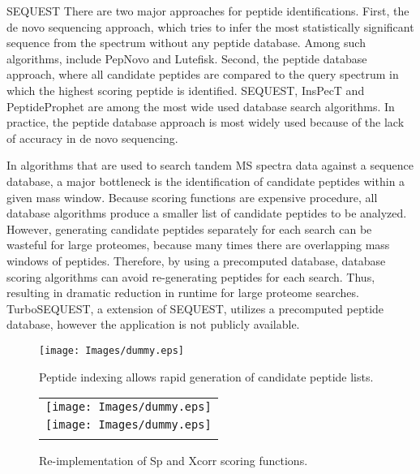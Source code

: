 \documentclass{bioinfo}
\begin{document}
SEQUEST\citep{eng:approach}
There are two major approaches for peptide identifications. First, the de novo sequencing approach, which tries to infer the most statistically significant sequence from the spectrum without any peptide database. Among such algorithms, include PepNovo and Lutefisk. Second, the peptide database approach, where all candidate peptides are compared to the query spectrum in which the highest scoring peptide is identified. SEQUEST, InsPecT and PeptideProphet are among the most wide used database search algorithms. In practice, the peptide database approach is most widely used because of the lack of accuracy in de novo sequencing.

In algorithms that are used to search tandem MS spectra data against a sequence database, a major bottleneck is the identification of candidate peptides within a given mass window. Because scoring functions are expensive procedure, all database algorithms produce a smaller list of candidate peptides to be analyzed. However, generating candidate peptides separately for each search can be wasteful for large proteomes, because many times there are overlapping mass windows of peptides. Therefore, by using a precomputed database, database scoring algorithms can avoid re-generating peptides for each search. Thus, resulting in dramatic reduction in runtime for large proteome searches. TurboSEQUEST, a extension of SEQUEST, utilizes a precomputed peptide database, however the application is not publicly available. 


\begin{figure}
  \centering
  \texttt{[image: Images/dummy.eps]}
  \caption{Peptide indexing allows rapid generation of candidate peptide
  lists.}
  \label{figure:indexing}
\end{figure}

\begin{figure}
  \centering
  \begin{tabular}{c}
  \texttt{[image: Images/dummy.eps]} \\
  \texttt{[image: Images/dummy.eps]} \\
  \caption{Re-implementation of Sp and Xcorr scoring functions.}
  \label{figure:indexing}
  \end{tabular}
\end{figure}
\end{document}
